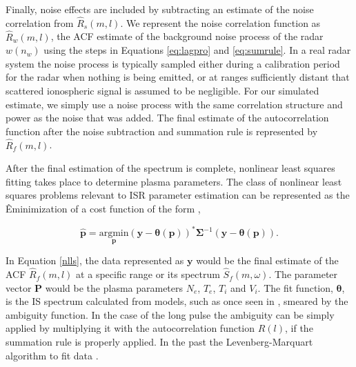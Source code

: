 Finally, noise effects are included by subtracting an estimate of the noise correlation from $\widehat{R}_s(m,l)$.  We represent the noise correlation function as $\widehat{R}_w(m,l)$, the ACF estimate of the background noise process of the radar $w(n_w)$ using the steps in Equations \ref{eq:lagpro} and \ref{eq:sumrule}. In a real radar system the noise process is typically sampled either during a calibration period for the radar when nothing is being emitted, or at ranges sufficiently distant that scattered ionospheric signal is assumed to be negligible. For our simulated estimate, we simply use a noise process with the same correlation structure and power as the noise that was added. The final estimate of the autocorrelation function after the noise subtraction and summation rule is represented by $\widehat{R}_f(m,l)$.


After the final estimation of the spectrum is complete, nonlinear least squares fitting takes place to determine plasma parameters.  
The class of nonlinear least squares problems relevant to ISR parameter estimation can be represented as the Êminimization of a cost function of the form \cite{kayvol1},

\begin{equation}
	\mathbf{\hat{p}}= \underset{\mathbf{p}}{\text{argmin}} (\mathbf{y}-\bm{\theta}(\mathbf{p}))^*\bm{\Sigma}^{-1}(\mathbf{y}-\bm{\theta}(\mathbf{p})).
\label{nlls}
\end{equation}

In Equation \ref{nlls}, the data represented as $\mathbf{y}$ would be the final estimate of the ACF $\widehat{R}_f(m,l)$ at a specific range or its spectrum $\widehat{S}_f(m,\omega)$. The parameter vector $\mathbf{P}$ would be the plasma parameters $N_e$, $T_e$, $T_i$ and $V_i$. The fit function, $\bm{\theta}$, is the IS spectrum calculated from models, such as once seen in \cite{kudeki:milla:1}, smeared by the ambiguity function. In the case of the long pulse the ambiguity can be simply applied by multiplying it with the autocorrelation function $R(l)$, if the summation rule is properly applied. In the past the Levenberg-Marquart algorithm to fit data \cite{nikoukar2008}.

